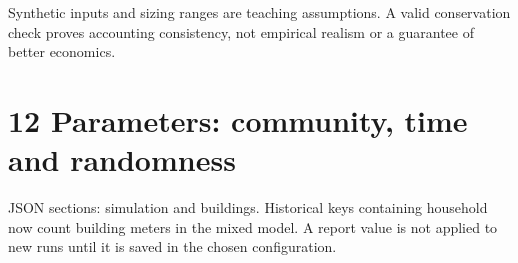 \documentclass[a4paper,11pt]{article}
\begin{document}
Synthetic inputs and sizing ranges are teaching assumptions. A valid conservation check proves accounting consistency, not empirical realism or a guarantee of better economics.
\par\medskip

\clearpage

\section*{12  Parameters: community, time and randomness}
\par\medskip

JSON sections: simulation and buildings. Historical keys containing household now count building meters in the mixed model. A report value is not applied to new runs until it is saved in the chosen configuration.
\par\medskip
\end{document}
